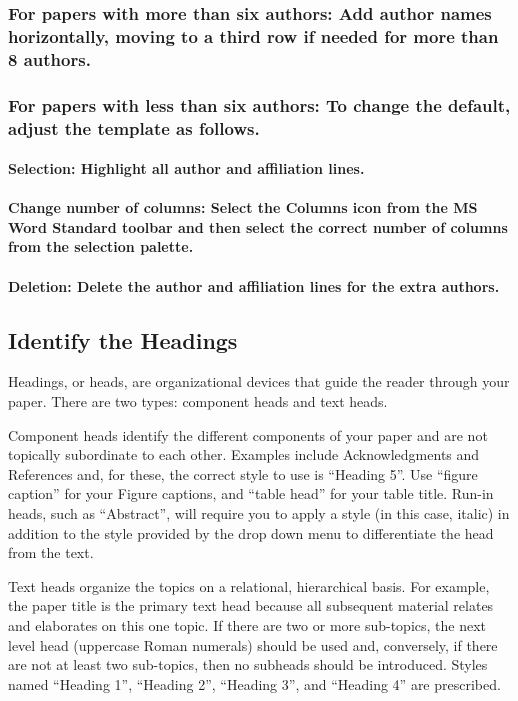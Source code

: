 \documentclass[preprint,12pt,authoryear]{elsarticle}
\begin{document}
\subsubsection{For papers with more than six authors: Add author names horizontally, moving to a third row if needed for more than 8 authors.}

\subsubsection{For papers with less than six authors: To change the default, adjust the template as follows.}

\paragraph{Selection: Highlight all author and affiliation lines.}

\paragraph{Change number of columns: Select the Columns icon from the MS Word Standard toolbar and then select the correct number of columns from the selection palette.}

\paragraph{Deletion: Delete the author and affiliation lines for the extra authors.}

\subsection{Identify the Headings}

Headings, or heads, are organizational devices that guide the reader through your paper. There are two types: component heads and text heads.

Component heads identify the different components of your paper and are not topically subordinate to each other. Examples include Acknowledgments and References and, for these, the correct style to use is “Heading 5”. Use “figure caption” for your Figure captions, and “table head” for your table title. Run-in heads, such as “Abstract”, will require you to apply a style (in this case, italic) in addition to the style provided by the drop down menu to differentiate the head from the text.

Text heads organize the topics on a relational, hierarchical basis. For example, the paper title is the primary text head because all subsequent material relates and elaborates on this one topic. If there are two or more sub-topics, the next level head (uppercase Roman numerals) should be used and, conversely, if there are not at least two sub-topics, then no subheads should be introduced. Styles named “Heading 1”, “Heading 2”, “Heading 3”, and “Heading 4” are prescribed.
\end{document}
